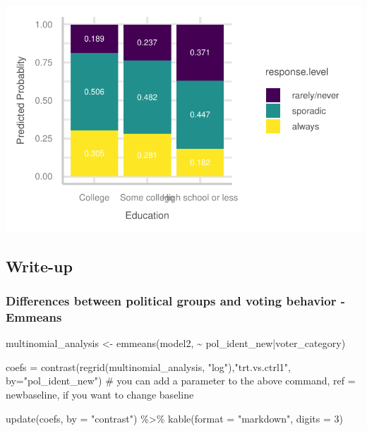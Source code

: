\documentclass[
  letterpaper,
  DIV=11,
  numbers=noendperiod]{scrartcl}
\newenvironment{Shaded}{\begin{snugshade}}{\end{snugshade}}
\newcommand{\AttributeTok}[1]{\textcolor[rgb]{0.40,0.45,0.13}{#1}}
\newcommand{\CommentTok}[1]{\textcolor[rgb]{0.37,0.37,0.37}{#1}}
\newcommand{\DecValTok}[1]{\textcolor[rgb]{0.68,0.00,0.00}{#1}}
\newcommand{\FunctionTok}[1]{\textcolor[rgb]{0.28,0.35,0.67}{#1}}
\newcommand{\NormalTok}[1]{\textcolor[rgb]{0.00,0.23,0.31}{#1}}
\newcommand{\OtherTok}[1]{\textcolor[rgb]{0.00,0.23,0.31}{#1}}
\newcommand{\SpecialCharTok}[1]{\textcolor[rgb]{0.37,0.37,0.37}{#1}}
\newcommand{\StringTok}[1]{\textcolor[rgb]{0.13,0.47,0.30}{#1}}
\begin{document}
\includegraphics{Lab4_multinom_Questions-1_files/figure-pdf/unnamed-chunk-15-1.pdf}

\subsection{Write-up}\label{write-up}

\subsubsection{Differences between political groups and voting behavior
-
Emmeans}\label{differences-between-political-groups-and-voting-behavior---emmeans}

\begin{Shaded}
\begin{Highlighting}[]
\NormalTok{multinomial\_analysis }\OtherTok{\textless{}{-}} \FunctionTok{emmeans}\NormalTok{(model2, }\SpecialCharTok{\textasciitilde{}}\NormalTok{ pol\_ident\_new}\SpecialCharTok{|}\NormalTok{voter\_category)}

\NormalTok{coefs }\OtherTok{=} \FunctionTok{contrast}\NormalTok{(}\FunctionTok{regrid}\NormalTok{(multinomial\_analysis, }\StringTok{"log"}\NormalTok{),}\StringTok{"trt.vs.ctrl1"}\NormalTok{,  }\AttributeTok{by=}\StringTok{"pol\_ident\_new"}\NormalTok{)}
\CommentTok{\# you can add a parameter to the above command, ref = newbaseline, if you want to change baseline}

\FunctionTok{update}\NormalTok{(coefs, }\AttributeTok{by =} \StringTok{"contrast"}\NormalTok{) }\SpecialCharTok{\%\textgreater{}\%}
 \FunctionTok{kable}\NormalTok{(}\AttributeTok{format =} \StringTok{"markdown"}\NormalTok{, }\AttributeTok{digits =} \DecValTok{3}\NormalTok{)}
\end{Highlighting}
\end{Shaded}
\end{document}
